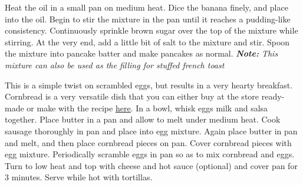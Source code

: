 \documentclass[oneside]{recipe}
\begin{document}



Heat the oil in a small pan on medium heat. Dice the banana finely, and place into the oil. Begin to stir the mixture in the pan until it reaches a pudding-like consistency. 
Continuously sprinkle brown sugar over the top of the mixture while stirring. At the very end, add a little bit of salt to the mixture and stir. Spoon the mixture into pancake batter and make pancakes as normal. \textit{\textbf{Note:} This mixture can also be used as the filling for stuffed french toast}

This is a simple twist on scrambled eggs, but results in a very hearty breakfast. Cornbread is a very versatile dish that you can either buy at the store ready-made or make with the recipe \href{}{\underline{here}}. In a bowl, whisk eggs milk and salsa together. Place butter in a pan and allow to melt under medium heat. Cook sausage thoroughly in pan and place into egg mixture. Again place butter in pan and melt, and then place cornbread pieces on pan. Cover cornbread pieces with egg mixture. Periodically scramble eggs in pan so as to mix cornbread and eggs. Turn to low heat and top with cheese and hot sauce (optional) and cover pan for 3 minutes. Serve while hot with tortillas. 

\end{document}
